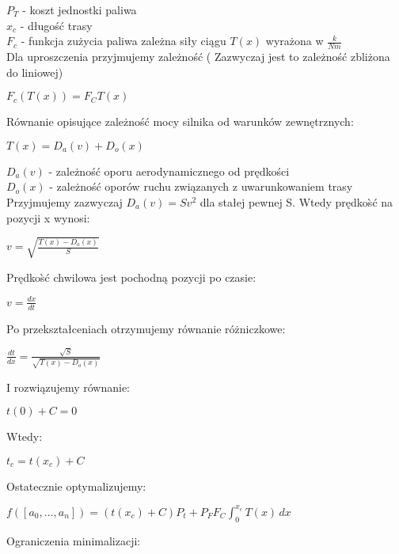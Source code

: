 \documentclass[12pt, letterpaper, twoside]{article}
\begin{document}
\(P_T\) - koszt jednostki paliwa \\
\(x_c\) - długo{{\' s}}ć trasy\\
\(F_c\) - funkcja zużycia paliwa zależna siły ciągu \(T(x)\) wyrażona w \( \frac{k}{N m}\) \\
Dla uproszczenia przyjmujemy zależno{{\' s}}ć ( Zazwyczaj jest to zależno{{\' s}}ć zbliżona do liniowej) \\
\begin{center}
 \(F_c(T(x)) = F_C T(x) \) \\
\end{center}
Równanie opisujące zależno{{\' s}}ć mocy silnika od warunków zewnętrznych:\\
\begin{center}
\( T(x) = D_a(v) + D_o(x) \) \\
\end{center}
\( D_a(v) \) - zależno{{\' s}}ć oporu aerodynamicznego od prędko{{\' s}}ci \\
\( D_o(x) \) - zależno{{\' s}}ć oporów ruchu związanych z uwarunkowaniem trasy \\
Przyjmujemy zazwyczaj \(D_a(v) = Sv^2 \) dla stałej pewnej S.
Wtedy prędko{{\`s}}ć na pozycji x wynosi: \\
\begin{center}
\(v =\sqrt{\frac{T(x) - D_o(x) }{ S} } \)
\end{center}
Prędko{{\`s}}ć chwilowa jest pochodną pozycji po czasie: \\
\begin{center}
\(v =\frac{dx}{dt} \)
\end{center}
Po przekształceniach otrzymujemy równanie różniczkowe:
\begin{center}
\(\frac{dt}{dx} = \frac{\sqrt{S}}{\sqrt{T(x) - D_o(x)}} \) \\
\end{center}
I rozwiązujemy równanie:
\begin{center}
\(  t(0) + C = 0 \) \\
\end{center}
Wtedy:
\begin{center}
\(  t_c = t(x_c) + C \) \\
\end{center}
Ostatecznie optymalizujemy:
\begin{center}
\( f([a_0, ..., a_n]) = (t(x_c) + C )P_t + P_F F_C \int_{0}^{x_c}  T(x) \,dx \)\\
\end{center}
\begin{center}
Ograniczenia minimalizacji:\\
\end{center}
\end{document}
